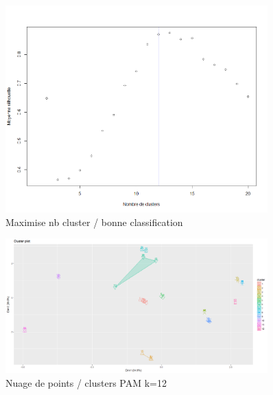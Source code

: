 %
%

\begin{figure}[H]
\centering
\includegraphics[width=0.90\textwidth]{../Fig/RTUPB/rtupb-elbow-pre.png}
\caption{Maximise nb cluster / bonne classification}
\end{figure}

\begin{figure}[H]
\centering
\includegraphics[width=0.90\textwidth]{../Fig/RTUPB/rtupb-pam-k12.png}
\caption{Nuage de points / clusters PAM k=12 }
\end{figure}

